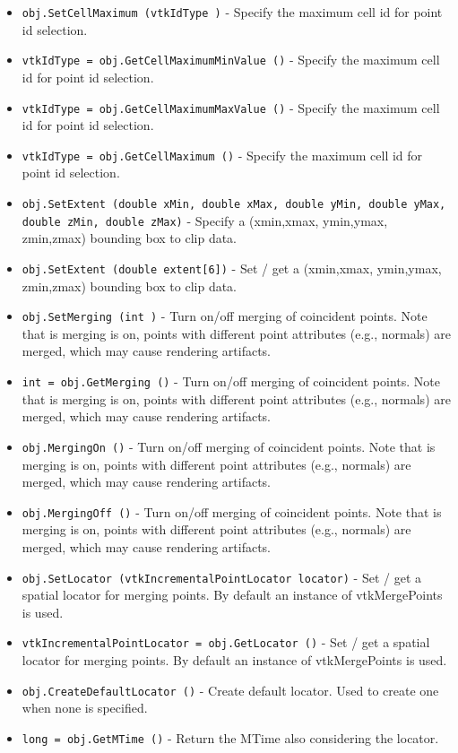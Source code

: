 \begin{itemize}
\item  \verb|obj.SetCellMaximum (vtkIdType )| -  Specify the maximum cell id for point id selection.

\item  \verb|vtkIdType = obj.GetCellMaximumMinValue ()| -  Specify the maximum cell id for point id selection.

\item  \verb|vtkIdType = obj.GetCellMaximumMaxValue ()| -  Specify the maximum cell id for point id selection.

\item  \verb|vtkIdType = obj.GetCellMaximum ()| -  Specify the maximum cell id for point id selection.

\item  \verb|obj.SetExtent (double xMin, double xMax, double yMin, double yMax, double zMin, double zMax)| -  Specify a (xmin,xmax, ymin,ymax, zmin,zmax) bounding box to clip data.

\item  \verb|obj.SetExtent (double extent[6])| -  Set / get a (xmin,xmax, ymin,ymax, zmin,zmax) bounding box to clip data.

\item  \verb|obj.SetMerging (int )| -  Turn on/off merging of coincident points. Note that is merging is
 on, points with different point attributes (e.g., normals) are merged,
 which may cause rendering artifacts.

\item  \verb|int = obj.GetMerging ()| -  Turn on/off merging of coincident points. Note that is merging is
 on, points with different point attributes (e.g., normals) are merged,
 which may cause rendering artifacts.

\item  \verb|obj.MergingOn ()| -  Turn on/off merging of coincident points. Note that is merging is
 on, points with different point attributes (e.g., normals) are merged,
 which may cause rendering artifacts.

\item  \verb|obj.MergingOff ()| -  Turn on/off merging of coincident points. Note that is merging is
 on, points with different point attributes (e.g., normals) are merged,
 which may cause rendering artifacts.

\item  \verb|obj.SetLocator (vtkIncrementalPointLocator locator)| -  Set / get a spatial locator for merging points. By
 default an instance of vtkMergePoints is used.

\item  \verb|vtkIncrementalPointLocator = obj.GetLocator ()| -  Set / get a spatial locator for merging points. By
 default an instance of vtkMergePoints is used.

\item  \verb|obj.CreateDefaultLocator ()| -  Create default locator. Used to create one when none is specified.

\item  \verb|long = obj.GetMTime ()| -  Return the MTime also considering the locator.

\end{itemize}
